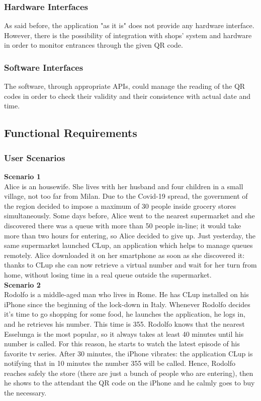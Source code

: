\documentclass[table, 12pt]{article}
\begin{document}
\subsubsection{Hardware Interfaces}
As said before, the application "as it is" does not provide any hardware interface.
However, there is the possibility of integration with shops' system and hardware in order to monitor entrances through the given QR code.
\subsubsection{Software Interfaces}
The software, through appropriate APIs, could manage the reading of the QR codes in order to check their validity and their consistence with actual date and time.

\subsection{Functional Requirements}
\subsubsection{User Scenarios}
\textbf{Scenario 1}\\
Alice is an housewife. She lives with her husband and four children in a small village, not too far from Milan. Due to the Covid-19 spread, the government of the region decided to impose a maximum of 30 people inside grocery stores simultaneously. Some days before, Alice went to the nearest supermarket and she discovered there was a queue with more than 50 people in-line; it would take more than two hours for entering, so Alice decided to give up. Just yesterday, the same supermarket launched CLup, an application which helps to manage queues remotely. Alice downloaded it on her smartphone as soon as she discovered it: thanks to CLup she can now retrieve a virtual number and wait for her turn from home, without losing time in a real queue outside the supermarket.\\

\textbf{Scenario 2}\\
Rodolfo is a middle-aged man who lives in Rome. He has CLup installed on his iPhone since the beginning of the lock-down in Italy. Whenever Rodolfo decides it's time to go shopping for some food, he launches the application, he logs in, and he retrieves his number. This time is 355. Rodolfo knows that the nearest Esselunga is the most popular, so it always takes at least 40 minutes until his number is called. For this reason, he starts to watch the latest episode of his favorite tv series. After 30 minutes, the iPhone vibrates: the application CLup is notifying that in 10 minutes the number 355 will be called. Hence, Rodolfo reaches safely the store (there are just a bunch of people who are entering), then he shows to the attendant the QR code on the iPhone and he calmly goes to buy the necessary. \\
\end{document}
